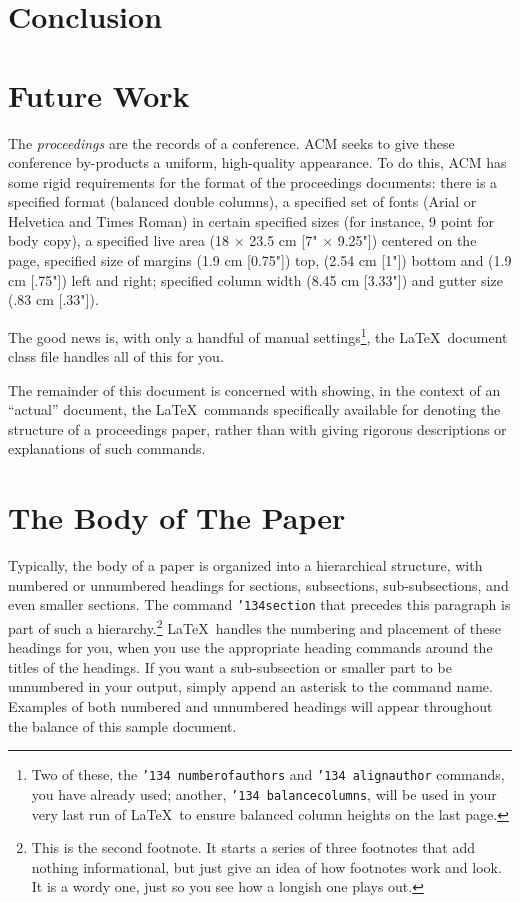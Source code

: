 \documentclass{sig-alternate-05-2015}
\begin{document}
\section{Conclusion}\label{sec:conclusion}
\section{Future Work}\label{future}

The \textit{proceedings} are the records of a conference.
ACM seeks to give these conference by-products a uniform,
high-quality appearance.  To do this, ACM has some rigid
requirements for the format of the proceedings documents: there
is a specified format (balanced  double columns), a specified
set of fonts (Arial or Helvetica and Times Roman) in
certain specified sizes (for instance, 9 point for body copy),
a specified live area (18 $\times$ 23.5 cm [7" $\times$ 9.25"]) centered on
the page, specified size of margins (1.9 cm [0.75"]) top, (2.54 cm [1"]) bottom
and (1.9 cm [.75"]) left and right; specified column width
(8.45 cm [3.33"]) and gutter size (.83 cm [.33"]).

The good news is, with only a handful of manual
settings\footnote{Two of these, the {\texttt{\char'134 numberofauthors}}
and {\texttt{\char'134 alignauthor}} commands, you have
already used; another, {\texttt{\char'134 balancecolumns}}, will
be used in your very last run of \LaTeX\ to ensure
balanced column heights on the last page.}, the \LaTeX\ document
class file handles all of this for you.

The remainder of this document is concerned with showing, in
the context of an ``actual'' document, the \LaTeX\ commands
specifically available for denoting the structure of a
proceedings paper, rather than with giving rigorous descriptions
or explanations of such commands.

\section{The {\secit Body} of The Paper}
Typically, the body of a paper is organized
into a hierarchical structure, with numbered or unnumbered
headings for sections, subsections, sub-subsections, and even
smaller sections.  The command \texttt{{\char'134}section} that
precedes this paragraph is part of such a
hierarchy.\footnote{This is the second footnote.  It
starts a series of three footnotes that add nothing
informational, but just give an idea of how footnotes work
and look. It is a wordy one, just so you see
how a longish one plays out.} \LaTeX\ handles the numbering
and placement of these headings for you, when you use
the appropriate heading commands around the titles
of the headings.  If you want a sub-subsection or
smaller part to be unnumbered in your output, simply append an
asterisk to the command name.  Examples of both
numbered and unnumbered headings will appear throughout the
balance of this sample document.
\end{document}
